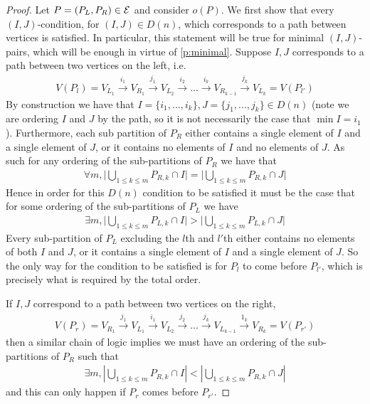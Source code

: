 \begin{proof}
Let $P=(P_L,P_R) \in \mathcal{E}$ and consider $o(P)$. 
We first show that every $(I,J)$-condition, for $(I,J) \in D(n)$, which corresponds to a path between vertices is satisfied. 
In particular, this statement will be true for minimal $(I,J)$-pairs, which will be enough in virtue of \cref{p:minimal}. 
Suppose $I,J$ corresponds to a path between two vertices on the left, i.e.
\begin{align*}
    V(P_l) = V_{L_1} \xrightarrow{i_1} V_{R_1}\xrightarrow{j_1} V_{L_2} \xrightarrow{i_2}... \xrightarrow{i_{k}} V_{R_{k-1}} \xrightarrow{j_k} V_{L_k}=V(P_{l'})
\end{align*}
By construction we have that $I = \{i_1,...,i_k\},J=\{j_1,...,j_k\} \in D(n)$ (note we are ordering $I$ and $J$ by the path, so it is not necessarily the case that $\min I = i_1$). 
Furthermore, each sub partition of $P_R$ either contains a single element of $I$ and a single element of $J$, or it contains no elements of $I$ and no elements of $J$. 
As such for any ordering of the sub-partitions of $P_R$ we have that 
\begin{align*}
    \forall m, \bigg|\bigcup_{1\leq k \leq m} P_{R,k} \cap I \bigg| = \bigg|\bigcup_{1\leq k \leq m} P_{R,k} \cap J \bigg|
\end{align*}
Hence in order for this $D(n)$ condition to be satisfied it must be the case that for some ordering of the sub-partitions of $P_L$ we have
\begin{align*}
    \exists m, \bigg| \bigcup_{1\leq k \leq m} P_{L,k} \cap I \bigg| > \bigg|\bigcup_{1\leq k \leq m} P_{L,k} \cap J \bigg|
\end{align*}
Every sub-partition of $P_L$ excluding the $l$th and $l'$th either contains no elements of both $I$ and $J$, or it contains a single element of $I$ and a single element of $J$. 
So the only way for the condition to be satisfied is for $P_l$ to come before $P_{l'}$, which is precisely what is required by the total order.

If $I,J$ correspond to a path between two vertices on the right,
\begin{align*}
    V(P_r) = V_{R_1} \xrightarrow{j_1} V_{L_1}\xrightarrow{i_1} V_{L_2} \xrightarrow{j_2}... \xrightarrow{j_{k}} V_{L_{k-1}} \xrightarrow{1_k} V_{R_k}=V(P_{r'})
\end{align*}
then a similar chain of logic implies we must have an ordering of the sub-partitions of $P_R$ such that
\begin{align*}
    \exists m, |\bigcup_{1\leq k \leq m} P_{R,k} \cap I| < |\bigcup_{1\leq k \leq m} P_{R,k} \cap J|
\end{align*}
and this can only happen if $P_r$ comes before $P_{r'}$.
\end{proof}

